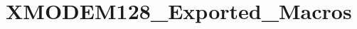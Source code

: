\hypertarget{group___x_m_o_d_e_m128___exported___macros}{}\section{X\+M\+O\+D\+E\+M128\+\_\+\+Exported\+\_\+\+Macros}
\label{group___x_m_o_d_e_m128___exported___macros}
